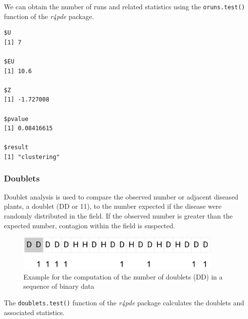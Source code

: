 \documentclass[
  letterpaper,
  DIV=11,
  numbers=noendperiod]{scrreprt}
\newenvironment{Shaded}{\begin{snugshade}}{\end{snugshade}}
\newcommand{\FunctionTok}[1]{\textcolor[rgb]{0.28,0.35,0.67}{#1}}
\newcommand{\NormalTok}[1]{\textcolor[rgb]{0.00,0.23,0.31}{#1}}
\newcommand{\SpecialCharTok}[1]{\textcolor[rgb]{0.37,0.37,0.37}{#1}}
\begin{document}
We can obtain the number of runs and related statistics using the
\texttt{oruns.test()} function of the \emph{r4pde} package.

\begin{Shaded}
\end{Shaded}

\begin{verbatim}
$U
[1] 7

$EU
[1] 10.6

$Z
[1] -1.727008

$pvalue
[1] 0.08416615

$result
[1] "clustering"
\end{verbatim}

\hypertarget{doublets}{%
\subsubsection{Doublets}\label{doublets}}

Doublet analysis is used to compare the observed number or adjacent
diseased plants, a doublet (DD or 11), to the number expected if the
disease were randomly distributed in the field. If the observed number
is greater than the expected number, contagion within the field is
suspected.

\begin{figure}

{\centering \includegraphics[width=4.01042in,height=\textheight]{imgs/doublets.png}

}

\caption{\label{fig-doublet1}Example for the computation of the number
of doublets (DD) in a sequence of binary data}

\end{figure}

The \texttt{doublets.test()} function of the \emph{r4pde} package
calculates the doublets and associated statistics.

\begin{Shaded}
\end{Shaded}
\end{document}
